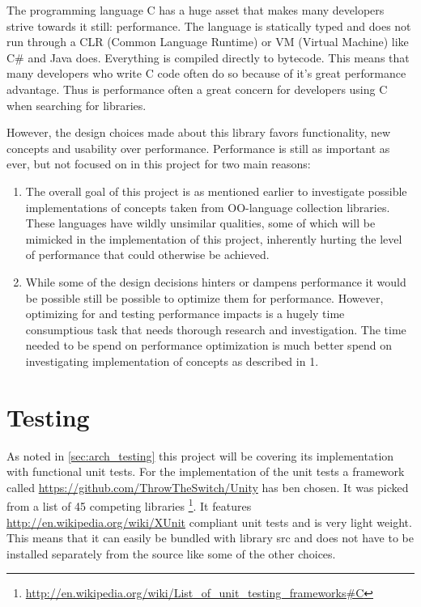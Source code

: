 \documentclass[table]{ituthesis}
\begin{document}
The programming language C has a huge asset that makes many developers strive towards it still: performance. The language is statically typed and does not run through a CLR (Common Language Runtime) or VM (Virtual Machine) like C\# and Java does. Everything is compiled directly to bytecode. This means that many developers who write C code often do so because of it's great performance advantage. Thus is performance often a great concern for developers using C when searching for libraries. 

However, the design choices made about this library favors functionality, new concepts and usability over performance. Performance is still as important as ever, but not focused on in this project for two main reasons:

\begin{enumerate}
	\item The overall goal of this project is as mentioned earlier to investigate possible implementations of concepts taken from OO-language collection libraries. These languages have wildly unsimilar qualities, some of which will be mimicked in the implementation of this project, inherently hurting the level of performance that could otherwise be achieved.
	\item While some of the design decisions hinters or dampens performance it would be possible still be possible to optimize them for performance. However, optimizing for and testing performance impacts is a hugely time consumptious task that needs thorough research and investigation. The time needed to be spend on performance optimization is much better spend on investigating implementation of concepts as described in 1.
\end{enumerate}

\section{Testing}

	As noted in \autoref{sec:arch_testing} this project will be covering its implementation with functional unit tests. For the implementation of the unit tests a framework called \href{Unity}{https://github.com/ThrowTheSwitch/Unity} has ben chosen. It was picked from a list of 45 competing libraries \footnote{\href{http://en.wikipedia.org/wiki/List\_of\_unit\_testing\_frameworks\#C}{http://en.wikipedia.org/wiki/List\_of\_unit\_testing\_frameworks\#C}}. It features \href{xUnit}{http://en.wikipedia.org/wiki/XUnit} compliant unit tests and is very light weight. This means that it can easily be bundled with library src and does not have to be installed separately from the source like some of the other choices.
\end{document}
